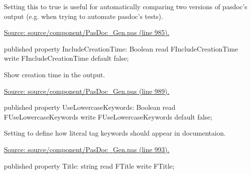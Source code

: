 \documentclass{report}
\newif\ifpdf
\begin{document}
\begin{list}{}
Setting this to true is useful for automatically comparing two versions of pasdoc's output (e.g. when trying to automate pasdoc's tests).\par
\href{https://github.com/pasdoc/pasdoc/blob/master/source/component/PasDoc_Gen.pas#L985}{Source: source/component/PasDoc{\_}Gen.pas (line 985).}\label{PasDoc_Gen.TDocGenerator-IncludeCreationTime}
\item[\textbf{IncludeCreationTime}\hfill]
\ifpdf
\begin{flushleft}
\fi
\begin{ttfamily}
published property IncludeCreationTime: Boolean
      read FIncludeCreationTime write FIncludeCreationTime default false;\end{ttfamily}

\ifpdf
\end{flushleft}
\fi


\par Show creation time in the output.\par
\href{https://github.com/pasdoc/pasdoc/blob/master/source/component/PasDoc_Gen.pas#L989}{Source: source/component/PasDoc{\_}Gen.pas (line 989).}\label{PasDoc_Gen.TDocGenerator-UseLowercaseKeywords}
\item[\textbf{UseLowercaseKeywords}\hfill]
\ifpdf
\begin{flushleft}
\fi
\begin{ttfamily}
published property UseLowercaseKeywords: Boolean
      read FUseLowercaseKeywords write FUseLowercaseKeywords default false;\end{ttfamily}

\ifpdf
\end{flushleft}
\fi


\par Setting to define how literal tag keywords should appear in documentaion.\par
\href{https://github.com/pasdoc/pasdoc/blob/master/source/component/PasDoc_Gen.pas#L993}{Source: source/component/PasDoc{\_}Gen.pas (line 993).}\label{PasDoc_Gen.TDocGenerator-Title}
\item[\textbf{Title}\hfill]
\ifpdf
\begin{flushleft}
\fi
\begin{ttfamily}
published property Title: string read FTitle write FTitle;\end{ttfamily}

\ifpdf
\end{flushleft}
\fi



\end{list}
\end{document}

